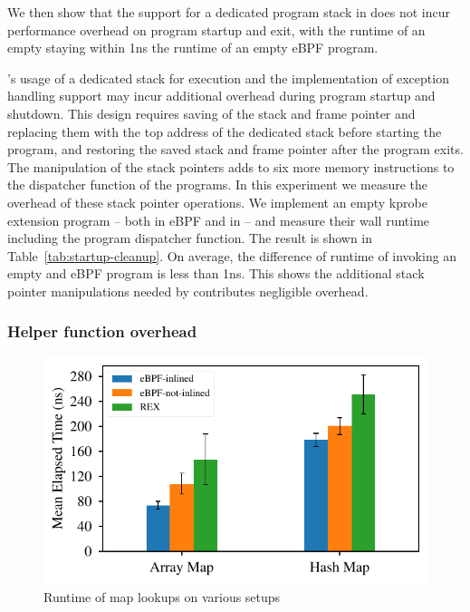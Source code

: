 We then show that the support for a dedicated program stack in \projname{} does
    not incur performance overhead on program startup and exit, with the
    runtime of an empty \projname{} staying within 1ns the runtime of an empty
    eBPF program.

\projname{}'s usage of a dedicated stack for execution and the implementation
    of exception handling support may incur additional overhead during program
    startup and shutdown.
This design requires saving of the stack and frame pointer and replacing them
    with the top address of the dedicated stack before starting the program,
    and restoring the saved stack and frame pointer after the program exits.
The manipulation of the stack pointers adds to six more memory instructions to
    the dispatcher function of the \projname{} programs.
In this experiment we measure the overhead of these stack pointer operations.
We implement an empty kprobe extension program -- both in eBPF and in
    \projname{} -- and measure their wall runtime including the program
    dispatcher function.
The result is shown in Table~\ref{tab:startup-cleanup}.
On average, the difference of runtime of invoking an empty \projname{} and eBPF
    program is less than 1ns.
This shows the additional stack pointer manipulations needed by \projname{}
    contributes negligible overhead.

\subsubsection{Helper function overhead}
\label{eval:inline}

\begin{figure}[t]
    \includegraphics[width=1.0\linewidth]{figs/inline.pdf}
    \centering
    \vspace{-25pt}
    \caption{Runtime of map lookups on various setups}
    \label{fig:eval-inline}
    \vspace{-12pt}
\end{figure}

